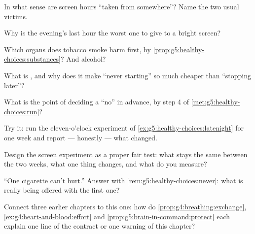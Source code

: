 \begin{exercise}[$\star$]\label{exo:g5:healthy-choices:3}
In what sense are screen hours ``taken from somewhere''?
Name the two usual victims.
\end{exercise}

\begin{exercise}[$\star$]\label{exo:g5:healthy-choices:4}
Why is the evening's last hour the worst one to give to a
bright screen?
\end{exercise}

\begin{exercise}[$\star$]\label{exo:g5:healthy-choices:5}
Which organs does tobacco smoke harm first, by
\cref{prop:g5:healthy-choices:substances}? And alcohol?
\end{exercise}

\begin{exercise}[$\star$]\label{exo:g5:healthy-choices:6}
What is , and why does it make ``never starting''
so much cheaper than ``stopping later''?
\end{exercise}

\begin{exercise}[$\star$]\label{exo:g5:healthy-choices:7}
What is the point of deciding a ``no'' in advance, by step
4 of \cref{met:g5:healthy-choices:run}?
\end{exercise}

\begin{exercise}[$\star$]\label{exo:g5:healthy-choices:8}
Try it: run the eleven-o'clock experiment of
\cref{ex:g5:healthy-choices:latenight} for one week and
report --- honestly --- what changed.
\end{exercise}

\begin{exercise}[$\star\star$]\label{exo:g5:healthy-choices:9}
Design the screen experiment as a proper fair test: what
stays the same between the two weeks, what one thing
changes, and what do you measure?
\end{exercise}

\begin{exercise}[$\star\star$]\label{exo:g5:healthy-choices:10}
``One cigarette can't hurt.'' Answer with
\cref{rem:g5:healthy-choices:never}: what is really being
offered with the first one?
\end{exercise}

\begin{exercise}[$\star\star\star$]\label{exo:g5:healthy-choices:11}
Connect three earlier chapters to this one: how do
\cref{prop:g4:breathing:exchange},
\cref{ex:g4:heart-and-blood:effort} and
\cref{prop:g5:brain-in-command:protect} each explain one
line of the contract or one warning of this chapter?
\end{exercise}
